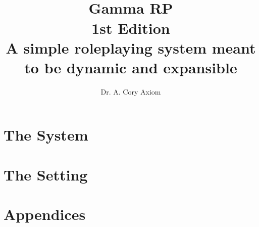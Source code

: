 \documentclass[10pt, titlepage, openright]{book}
\title{%
	 \\
	\color{grptitle}\textbf{Gamma RP} \\
	1st Edition \\
	\large A simple roleplaying system meant to be dynamic and expansible}
\author{Dr. A. Cory Axiom}
\begin{document}
	\color{grptitle}
	\maketitle

	\frontmatter
	\tableofcontents

	\mainmatter
	
	\part{The System}
	
	 
	
	
	
	\part{The Setting}
	
	
	

	\backmatter
	\part{Appendices}
	
	
	\listoffigures
	\listoftables
	\printindex
\end{document}

